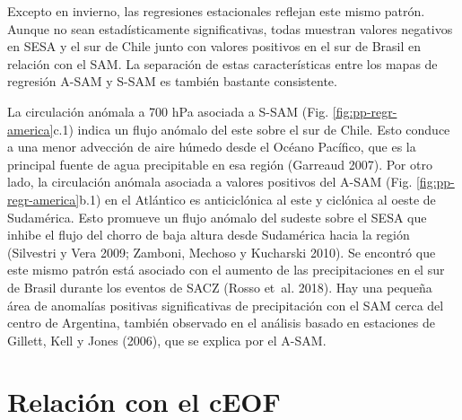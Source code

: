 \documentclass[12pt,oneside,a4paper]{reedthesis}
\begin{document}
Excepto en invierno, las regresiones estacionales reflejan este mismo patrón.
Aunque no sean estadísticamente significativas, todas muestran valores negativos en SESA y el sur de Chile junto con valores positivos en el sur de Brasil en relación con el SAM.
La separación de estas características entre los mapas de regresión A-SAM y S-SAM es también bastante consistente.

La circulación anómala a 700 hPa asociada a S-SAM (Fig. \ref{fig:pp-regr-america}c.1) indica un flujo anómalo del este sobre el sur de Chile.
Esto conduce a una menor advección de aire húmedo desde el Océano Pacífico, que es la principal fuente de agua precipitable en esa región (Garreaud 2007).
Por otro lado, la circulación anómala asociada a valores positivos del A-SAM (Fig. \ref{fig:pp-regr-america}b.1) en el Atlántico es anticiclónica al este y ciclónica al oeste de Sudamérica.
Esto promueve un flujo anómalo del sudeste sobre el SESA que inhibe el flujo del chorro de baja altura desde Sudamérica hacia la región (Silvestri y Vera 2009; Zamboni, Mechoso y Kucharski 2010).
Se encontró que este mismo patrón está asociado con el aumento de las precipitaciones en el sur de Brasil durante los eventos de SACZ (Rosso et~al. 2018).
Hay una pequeña área de anomalías positivas significativas de precipitación con el SAM cerca del centro de Argentina, también observado en el análisis basado en estaciones de Gillett, Kell y Jones (2006), que se explica por el A-SAM.

\hypertarget{sam-ceof}{%
\section{Relación con el cEOF}\label{sam-ceof}}
\end{document}
